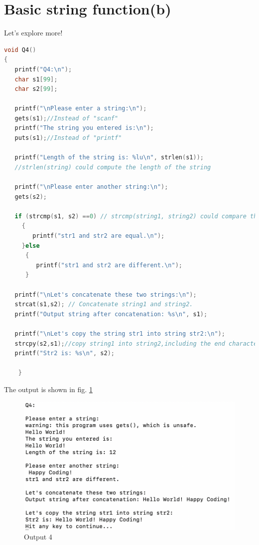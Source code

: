 \documentclass[12pt]{article}
\begin{document}
\section{Basic string function(b)}
Let's explore more! 
\begin{lstlisting}[language=C, caption= Solution 4]
void Q4()
{
   printf("Q4:\n");
   char s1[99];
   char s2[99];
   
   printf("\nPlease enter a string:\n");
   gets(s1);//Instead of "scanf"
   printf("The string you entered is:\n");
   puts(s1);//Instead of "printf"
   
   printf("Length of the string is: %lu\n", strlen(s1));
   //strlen(string) could compute the length of the string
 
   printf("\nPlease enter another string:\n");
   gets(s2);
   
   if (strcmp(s1, s2) ==0) // strcmp(string1, string2) could compare these two strings 
     {
        printf("str1 and str2 are equal.\n");
     }else
      {
         printf("str1 and str2 are different.\n");
      }
   
   printf("\nLet's concatenate these two strings:\n");
   strcat(s1,s2); // Concatenate string1 and string2.
   printf("Output string after concatenation: %s\n", s1);
   
   printf("\nLet's copy the string str1 into string str2:\n");
   strcpy(s2,s1);//copy string1 into string2,including the end character '\0'
   printf("Str2 is: %s\n", s2);
   
    }
\end{lstlisting}{}
The output is shown in fig. \ref{output4}

\begin{figure}[h]
\includegraphics[scale=0.85]{Images/output4.png} 
\caption{Output 4}
\label{output4}
\end{figure}

 
\end{document}

